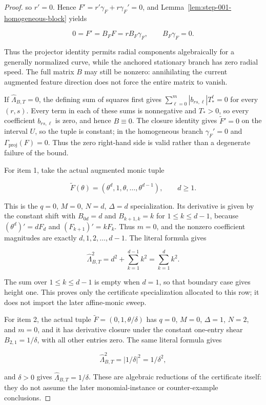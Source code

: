 \begin{proof}
so \(r'=0\). Hence \(F'=r'\gamma_F+r\gamma_F'=0\), and
Lemma~\ref{lem:step-001-homogeneous-block} yields

\begin{equation}
\label{eq:appendix-display-027}
0=F'=B_FF=rB_F\gamma_F,
\qquad
B_F\gamma_F=0.
\end{equation}

Thus the projector identity permits radial components algebraically for a generally normalized curve, while
the anchored stationary branch has zero radial speed. The full matrix \(B\) may still be nonzero: annihilating
the current augmented feature direction does not force the entire matrix to vanish.

If \(\widehat\Lambda_{B,T}=0\), the defining sum of squares first gives
\(\sum_{\ell=0}^m|b_{rs,\ell}|T_*^\ell=0\) for every \((r,s)\). Every term in each of these sums is
nonnegative and \(T_*>0\), so every coefficient \(b_{rs,\ell}\) is zero, and hence \(B\equiv0\). The closure
identity gives \(\widetilde F'=0\) on the interval \(U\), so the tuple is
constant; in the homogeneous branch \(\gamma_F'=0\) and \(\Gamma_{\mathrm{proj}}(F)=0\). Thus the zero right-hand
side is valid rather than a degenerate failure of the bound.

For item 1, take the actual augmented monic tuple

\begin{equation}
\label{eq:appendix-display-028}
\widetilde F(\theta)=(\theta^d,1,\theta,\ldots,\theta^{d-1}),
\qquad d\geq1.
\end{equation}

This is the \(q=0\), \(M=0\), \(N=d\), \(\Delta=d\) specialization. Its derivative is given by the constant
shift with \(B_{0d}=d\) and \(B_{k+1,k}=k\) for \(1\leq k\leq d-1\), because
\((\theta^d)'=dF_d\) and \((F_{k+1})'=kF_k\). Thus \(m=0\), and the nonzero coefficient magnitudes are exactly
\(d,1,2,\ldots,d-1\). The literal formula gives

\begin{equation}
\label{eq:appendix-display-029}
\widehat\Lambda_{B,T}^2
=d^2+\sum_{k=1}^{d-1}k^2
=\sum_{k=1}^d k^2.
\end{equation}

The sum over \(1\leq k\leq d-1\) is empty when \(d=1\), so that boundary case gives height one. This proves
only the certificate specialization allocated to this row; it does not import the later affine-monic sweep.

For item 2, the actual tuple \(\widetilde F=(0,1,\theta/\delta)\) has
\(q=0\), \(M=0\), \(\Delta=1\), \(N=2\), and \(m=0\), and it has derivative closure under the constant
one-entry shear \(B_{2,1}=1/\delta\), with all other entries zero. The same literal formula gives

\begin{equation}
\label{eq:appendix-display-030}
\widehat\Lambda_{B,T}^2=|1/\delta|^2=1/\delta^2,
\end{equation}

and \(\delta>0\) gives \(\widehat\Lambda_{B,T}=1/\delta\). These are algebraic reductions of the certificate
itself: they do not assume the later monomial-instance or counter-example conclusions. 
\end{proof}



